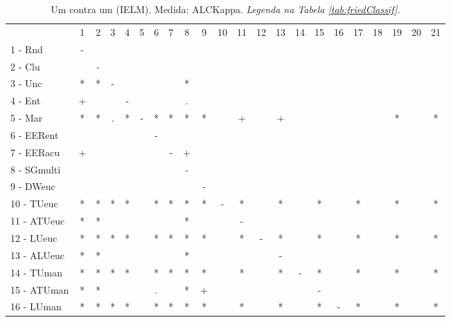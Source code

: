 \begin{table}[h]
\caption{Um contra um (IELM). Medida: ALCKappa. \textit{Legenda na Tabela \ref{tab:friedClassif}.}}
\begin{center}\begin{tabular}{lcc|cc|cc|cc|cc|cc|cc|cc|cc|cc|c}
 			& 1 & 2 & 3 & 4 & 5 & 6 & 7 & 8 & 9 & 10 & 11 & 12 & 13 & 14 & 15 & 16 & 17 & 18 & 19 & 20 & 21\\
1 - Rnd  	& - &   &   &   &   &   &   &   &   &   &   &   &   &   &   &   &   &   &   &   &   \\
2 - Clu  	&   & - &   &   &   &   &   &   &   &   &   &   &   &   &   &   &   &   &   &   &   \\ \hline
3 - Unc  	& * & * & - &   &   &   &   & * &   &   &   &   &   &   &   &   &   &   &   &   &   \\
4 - Ent  	& + &   &   & - &   &   &   & . &   &   &   &   &   &   &   &   &   &   &   &   &   \\ \hline
5 - Mar  	& * & * & . & * & - & * & * & * & * &   & + &   & + &   &   &   &   &   & * &   & * \\
6 - EERent	&   &   &   &   &   & - &   &   &   &   &   &   &   &   &   &   &   &   &   &   &   \\ \hline
7 - EERacu	& + &   &   &   &   &   & - & + &   &   &   &   &   &   &   &   &   &   &   &   &   \\
8 - SGmulti	&   &   &   &   &   &   &   & - &   &   &   &   &   &   &   &   &   &   &   &   &   \\ \hline
9 - DWeuc	&   &   &   &   &   &   &   &   & - &   &   &   &   &   &   &   &   &   &   &   &   \\
10 - TUeuc	& * & * & * & * &   & * & * & * & * & - & * &   & * &   & * &   & * &   & * &   & * \\ \hline
11 - ATUeuc	& * & * &   &   &   &   &   & * &   &   & - &   &   &   &   &   &   &   &   &   &   \\
12 - LUeuc	& * & * & * & * &   & * & * & * & * &   & * & - & * &   & * &   & * &   & * &   & * \\ \hline
13 - ALUeuc	& * & * &   &   &   &   &   & * &   &   &   &   & - &   &   &   &   &   &   &   &   \\
14 - TUman	& * & * & * & * &   & * & * & * & * &   & * &   & * & - & * &   & * &   & * &   & * \\ \hline
15 - ATUman	& * & * &   &   &   & . &   & * & + &   &   &   &   &   & - &   &   &   &   &   &   \\
16 - LUman	& * & * & * & * &   & * & * & * & * &   & * &   & * &   & * & - & * &   & * &   & * \\ \hline

\end{tabular}
\end{center}
\end{table}
